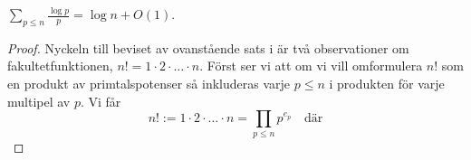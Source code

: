 \begin{theorem}
    $\sum_{p \leq n} \frac{\log p}{p} = \log n + O(1) $.
\end{theorem}
\begin{proof}
Nyckeln till beviset av ovanstående sats i \cite{cojocarumurty} är två observationer om fakultetfunktionen, \(n! = 1 \cdot 2 \cdot \dots \cdot n\). Först ser vi att om vi vill omformulera \(n!\) som en produkt av primtalspotenser så inkluderas varje $p \leq n$ i produkten för varje multipel av $p$. Vi får 
\[
    n! := 1 \cdot 2 \cdot \dots \cdot n = \prod_{p \leq n} p^{e_p} \quad \text{där}
\]    
\end{proof}